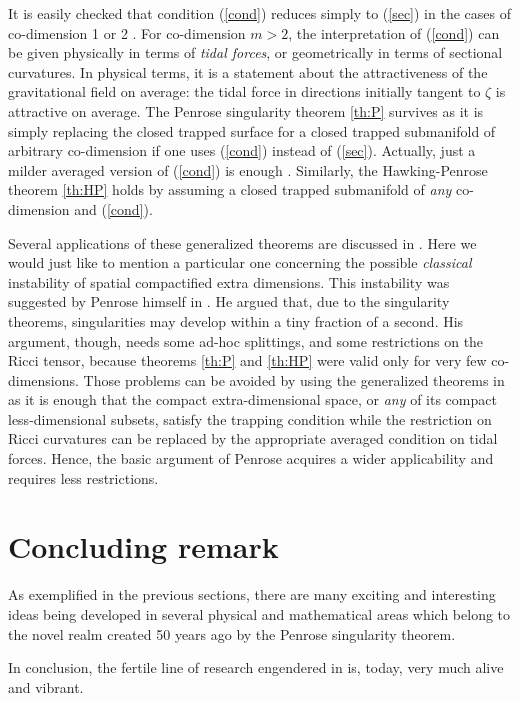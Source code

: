 \documentclass[12pt]{iopart}
\begin{document}
It is easily checked that condition (\ref{cond}) reduces simply to (\ref{sec}) in the cases of co-dimension 1 or 2 \cite{GaS}. For co-dimension $m>2$, the interpretation of (\ref{cond}) can be given physically in terms of {\em tidal forces}, or geometrically in terms of sectional curvatures.
In physical terms, it is a statement about the attractiveness of the gravitational field on average: the tidal force in directions initially tangent to $\zeta$ is attractive on average. The Penrose singularity theorem \ref{th:P} survives as it is simply replacing the closed trapped surface for a closed trapped submanifold of arbitrary co-dimension if one uses (\ref{cond}) instead of (\ref{sec}). Actually, just a milder averaged version of (\ref{cond}) is enough \cite{GaS}. Similarly, the Hawking-Penrose theorem \ref{th:HP} holds by assuming a closed trapped submanifold of {\em any} co-dimension and (\ref{cond}).

Several applications of these generalized theorems are discussed in \cite{GaS}. Here we would just like to mention a particular one concerning the possible {\em classical} instability of spatial compactified extra dimensions. This  instability was suggested by Penrose himself in \cite{Pextra}. He argued that, due to the singularity theorems, singularities may develop within a tiny fraction of a second. His argument, though, needs some ad-hoc splittings, and some restrictions on the Ricci tensor, because theorems \ref{th:P} and \ref{th:HP} were valid only for very few co-dimensions. Those problems can be avoided by using the generalized theorems in \cite{GaS} as it is enough that the compact extra-dimensional space, or {\em any} of its compact less-dimensional subsets, satisfy the trapping condition while the restriction on Ricci curvatures can be replaced by the appropriate averaged condition on tidal forces. 
Hence, the basic argument of Penrose acquires a wider applicability and requires less restrictions.

 

\section{Concluding remark}
As exemplified in the previous sections, there are many exciting and interesting ideas being developed in several physical and mathematical areas which belong to the novel realm created 50 years ago by the Penrose singularity theorem. 

In conclusion, the fertile line of research engendered in \cite{P} is, today, very much alive and vibrant.
\end{document}
